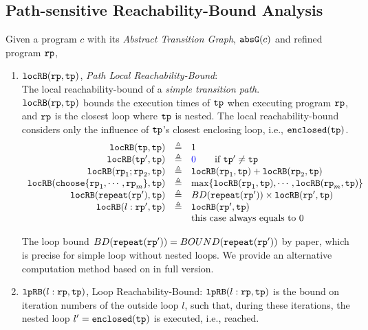\subsection{Path-sensitive Reachability-Bound Analysis}
Given a program $c$ with its \emph{Abstract Transition Graph}, $\mathtt{abs}{\mathtt{G}}(c)$ and refined program $\mathtt{rp}$,
\begin{enumerate}
  \item $\mathtt{locRB}(\mathtt{rp}, \mathtt{tp})$, \emph{Path Local Reachability-Bound}:
  \\
  The local reachability-bound of a \emph{simple transition path}. 
  \\
  $\mathtt{locRB}(\mathtt{rp}, \mathtt{tp})$ bounds the execution times of $\mathtt{tp}$ when executing program $\mathtt{rp}$,
  and $\mathtt{rp}$ is the closest loop where $\mathtt{tp}$ is nested.
  The local reachability-bound  considers only the influence of $\mathtt{tp}$'s closest enclosing loop, i.e., $\mathtt{enclosed}(\mathtt{tp})$.
  \[
    \begin{array}{rcl}
      \outinB(\tpath, \tpath) & \triangleq & 1 \\
      \outinB(\tpath', \tpath) & \triangleq & \highlight{0} \qquad \text{if } \tpath' \neq \tpath\\
      \outinB(\rprog_1;\rprog_2, \tpath) & \triangleq & \outinB(\rprog_1, \tpath) + \outinB(\rprog_2, \tpath) \\
      \outinB(\rpchoose{\rprog_1, \cdots, \rprog_m }, \tpath) & \triangleq 
      & \max\left\{ \outinB(\rprog_1, \tpath), \cdots, \outinB(\rprog_m, \tpath) \right\} \\
      \outinB(\rprepeat(\rprog'), \tpath) & \triangleq 
      & BD(\rprepeat(\rprog'))
       \times \outinB(\rprog', \tpath)
       \\
      \outinB(l: \rprog', \tpath) & \triangleq & \outinB(\rprog', \tpath) \\
      &  & \text{this case always equals to } 0 \\
    \end{array}
    \]
  
    The loop bound $BD(\mathtt{repeat}(\mathtt{rp}')) = BOUND(\mathtt{repeat}(\mathtt{rp}'))$ by paper\cite{GulwaniJK09}, which is precise for simple loop without nested loops. 
    We provide an alternative computation method based on \cite{sinn2017complexity} in full version.
    \item $\mathtt{lpRB}(l: \mathtt{rp}, \mathtt{tp})$,
    {Loop Reachability-Bound}:
      $\mathtt{lpRB}(l: \mathtt{rp}, \mathtt{tp})$
      is the bound on iteration numbers of the outside loop $l$,
      such that,
      during these iterations, the nested loop $l' = \mathtt{enclosed(\mathtt{tp})}$ is executed, i.e., reached.
      

\end{enumerate}
